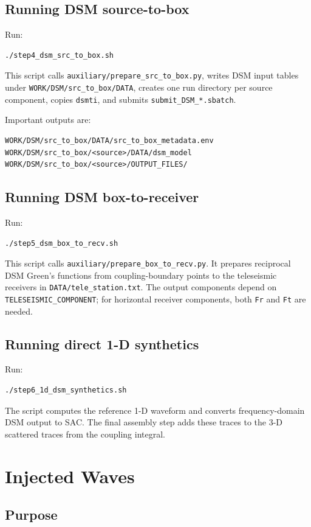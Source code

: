 \documentclass[11pt,oneside]{book}
\DeclareRobustCommand{\code}[1]{\nolinkurl{#1}}
\begin{document}
\section{Running DSM source-to-box}

Run:
\begin{lstlisting}
./step4_dsm_src_to_box.sh
\end{lstlisting}
This script calls \code{auxiliary/prepare_src_to_box.py}, writes DSM input
tables under \code{WORK/DSM/src_to_box/DATA}, creates one run directory per
source component, copies \code{dsmti}, and submits \code{submit_DSM_*.sbatch}.

Important outputs are:
\begin{lstlisting}
WORK/DSM/src_to_box/DATA/src_to_box_metadata.env
WORK/DSM/src_to_box/<source>/DATA/dsm_model
WORK/DSM/src_to_box/<source>/OUTPUT_FILES/
\end{lstlisting}

\section{Running DSM box-to-receiver}

Run:
\begin{lstlisting}
./step5_dsm_box_to_recv.sh
\end{lstlisting}
This script calls \code{auxiliary/prepare_box_to_recv.py}. It prepares
reciprocal DSM Green's functions from coupling-boundary points to the
teleseismic receivers in \code{DATA/tele_station.txt}. The output components
depend on \code{TELESEISMIC_COMPONENT}; for horizontal receiver components,
both \code{Fr} and \code{Ft} are needed.

\section{Running direct 1-D synthetics}

Run:
\begin{lstlisting}
./step6_1d_dsm_synthetics.sh
\end{lstlisting}
The script computes the reference 1-D waveform and converts frequency-domain
DSM output to SAC. The final assembly step adds these traces to the 3-D
scattered traces from the coupling integral.

\chapter{Injected Waves}

\section{Purpose}
\end{document}
